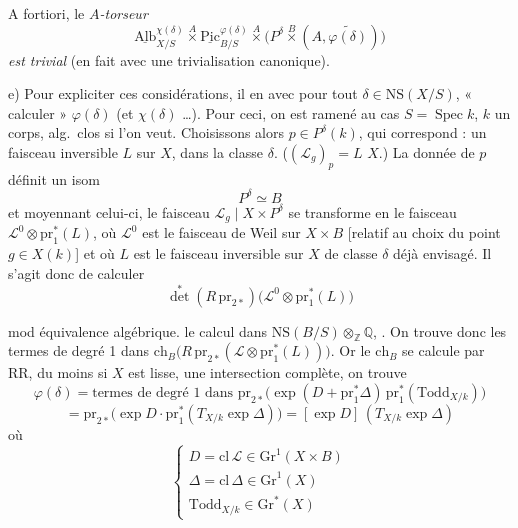 \documentclass[11pt,a4paper]{article}
\begin{document}

A fortiori, le \emph{$A$-torseur}
\[
\underline{\mathrm{Alb}}^{\chi(\delta)}_{X/S} \overset{A}{\times}
\underline{\mathrm{Pic}}^{\varphi(\delta)}_{B/S} \overset{A}{\times}
\bigl(P^{\delta} \overset{B}{\times} (A, \widetilde{\varphi(\delta)})\bigr)
\]
\emph{est trivial} (en fait avec une trivialisation canonique).

e) Pour expliciter ces considérations, il  en\-[core] \ill{}
avec pour tout $\delta \in \mathrm{NS}(X/S)$, « calculer » $\varphi(\delta)$
(et $\chi(\delta)$ \ldots). Pour ceci, on  est ramené au cas
$S = \operatorname{Spec} k$, $k$ un corps, alg.\ clos si l'on veut.
Choisissons alors $p \in P^{\delta}(k)$, qui correspond : un faisceau inversible
$L$ sur $X$, dans la classe $\delta$.
($(\mathcal{L}_g)_p = L$  $X$.)
La donnée de $p$ définit un isom
\[ P^{\delta} \simeq B \]
et moyennant celui-ci, le faisceau $\mathcal{L}_g \mid X \times P^{\delta}$
\struck{\ill{}} se transforme en le faisceau
$\mathcal{L}^{0} \otimes \mathrm{pr}_1^{*}(L)$, où $\mathcal{L}^{0}$ est le
faisceau de Weil sur $X \times B$ [relatif au choix du point $g \in X(k)$] et
où $L$ est le faisceau inversible sur $X$  de classe $\delta$
déjà envisagé. Il s'agit donc de calculer
\[
{\det}^{*}(R\,\mathrm{pr}_{2*})\bigl(\mathcal{L}^{0} \otimes \mathrm{pr}_1^{*}(L)\bigr)
\]


 mod équivalence algébrique.  le calcul
 dans
$\mathrm{NS}(B/S) \otimes_{\mathbb{Z}} \mathbb{Q}$, . On trouve donc les termes de degré 1 dans
$\mathrm{ch}_B\bigl(R\,\mathrm{pr}_{2*}(\mathcal{L} \otimes \mathrm{pr}_1^{*}(L))\bigr)$.
Or le $\mathrm{ch}_B$ se calcule par RR, du moins si $X$ est lisse, une
intersection complète, \ill{} on trouve
\[
\varphi(\delta) = \text{termes de degré 1 dans }
\mathrm{pr}_{2*}\bigl(\exp(D + \mathrm{pr}_1^{*}\Delta)\, \mathrm{pr}_1^{*}(\mathrm{Todd}_{X/k})\bigr)
\]
\[
= \mathrm{pr}_{2*}\bigl(\exp D \cdot \mathrm{pr}_1^{*}(T_{X/k} \exp \Delta)\bigr)
= [\exp D]\,(T_{X/k} \exp \Delta)
\]
où
\[
\begin{cases}
D = \mathrm{cl}\,\mathcal{L} \in \mathrm{Gr}^{1}(X \times B) \\
\Delta = \mathrm{cl}\,\Delta \in \mathrm{Gr}^{1}(X) \\
\mathrm{Todd}_{X/k} \in \mathrm{Gr}^{*}(X)
\end{cases}
\]
\end{document}

